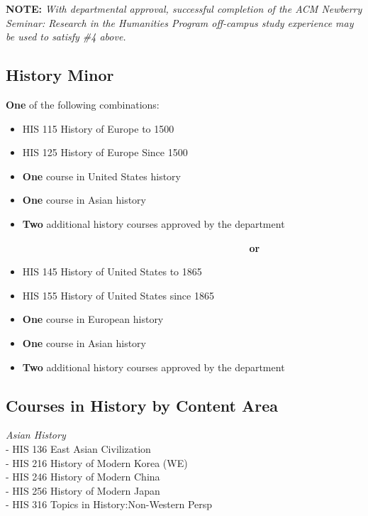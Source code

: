 \documentclass[
  letterpaper,
]{scrbook}
\begin{document}
\textbf{NOTE:} \emph{With departmental approval, successful completion
of the ACM Newberry Seminar: Research in the Humanities Program
off-campus study experience may be used to satisfy \#4 above.}

\subsection{History Minor}\label{history-minor}

\textbf{One} of the following combinations:

\begin{itemize}
\item
  HIS 115 History of Europe to 1500
\item
  HIS 125 History of Europe Since 1500
\item
  \textbf{One} course in United States history
\item
  \textbf{One} course in Asian history
\item
  \textbf{Two} additional history courses approved by the department

  ~~~~~~~~~~~~~~~~~~~~~~~~~~~~~~~~~~~~~~~~~~~~~ \textbf{or}
\item
  HIS 145 History of United States to 1865
\item
  HIS 155 History of United States since 1865
\item
  \textbf{One} course in European history
\item
  \textbf{One} course in Asian history
\item
  \textbf{Two} additional history courses approved by the department
\end{itemize}

\subsection{Courses in History by Content
Area}\label{courses-in-history-by-content-area}

\emph{Asian History}\\
- HIS 136 East Asian Civilization\\
- HIS 216 History of Modern Korea (WE)\\
- HIS 246 History of Modern China\\
- HIS 256 History of Modern Japan\\
- HIS 316 Topics in History:Non-Western Persp
\end{document}
